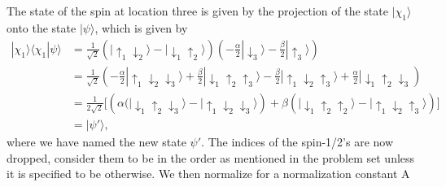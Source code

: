 \documentclass[a4paper,10pt]{article}
\begin{document}
\subsection{ }
The state of the spin at location three is given by the projection of the state $|\chi_1 \rangle$ onto the state $|\psi \rangle$, which is given by
%
\begin{align*}
|\chi_1\rangle \langle \chi_1 | \psi \rangle &= \frac{1}{\sqrt{2}}\left(|\uparrow_1 \downarrow_2 \rangle - |\downarrow_1 \uparrow_2\rangle\right)\left(-\frac{\alpha}{2}|\downarrow_3\rangle - \frac{\beta}{2}|\uparrow_3\rangle\right) \\
&= \frac{1}{\sqrt{2}}\left(-\frac{\alpha}{2}|\uparrow_1 \downarrow_2 \downarrow_3\rangle  + \frac{\beta}{2}|\downarrow_1\uparrow_2 \uparrow_3\rangle - \frac{\beta}{2}|\uparrow_1\downarrow_2\uparrow_3\rangle + \frac{\alpha}{2} |\downarrow_1\uparrow_2\downarrow_3\right) \\
&= \frac{1}{2\sqrt{2}}\big[\left(\alpha(|\downarrow_1\uparrow_2\downarrow_3\rangle - |\uparrow_1\downarrow_2\downarrow_3\rangle\right) +  \beta\left(|\downarrow_1 \uparrow_2 \uparrow_2\rangle - |\uparrow_1 \downarrow_2\uparrow_3\rangle\right)\big] \\
&= |\psi'\rangle,
\end{align*}
where we have named the new state $\psi'$. The indices of the spin-1/2's are now dropped, consider them to be in the order as mentioned in the problem set unless it is specified to be otherwise. We then normalize for a normalization constant A
%
\end{document}
